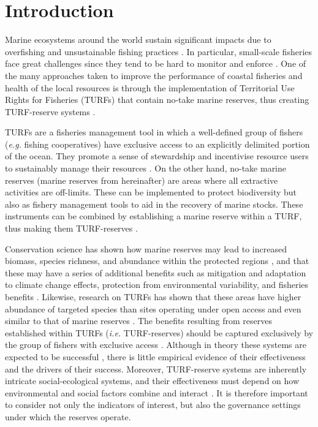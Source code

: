 \documentclass{frontiersSCNS}
\begin{document}
\hypertarget{introduction}{%
\section{Introduction}\label{introduction}}

Marine ecosystems around the world sustain significant impacts due to overfishing and unsustainable fishing practices \citep{pauly_2005-qV,worm_2006-IB,halpern_2008-dK}. In particular, small-scale fisheries face great challenges since they tend to be hard to monitor and enforce \citep{costello_2012}. One of the many approaches taken to improve the performance of coastal fisheries and health of the local resources is through the implementation of Territorial Use Rights for Fisheries (TURFs) that contain no-take marine reserves, thus creating TURF-reserve systems \citep{afflerbach_2014,gelcich_2015,lester_2017}.

TURFs are a fisheries management tool in which a well-defined group of fishers (\emph{e.g.} fishing cooperatives) have exclusive access to an explicitly delimited portion of the ocean. They promote a sense of stewardship and incentivise resource users to sustainably manage their resources \citep{gelcich_2008,costello_2010,mccay_2014}. On the other hand, no-take marine reserves (marine reserves from hereinafter) are areas where all extractive activities are off-limits. These can be implemented to protect biodiversity but also as fishery management tools to aid in the recovery of marine stocks. These instruments can be combined by establishing a marine reserve within a TURF, thus making them TURF-reserves \citep{afflerbach_2014,gelcich_2015,lester_2017}.

Conservation science has shown how marine reserves may lead to increased biomass, species richness, and abundance within the protected regions \citep{lester_2009}, and that these may have a series of additional benefits such as mitigation and adaptation to climate change effects, protection from environmental variability, and fisheries benefits \citep{roberts_2017-J9,micheli_2012-EU,krueck_2017-J1}. Likewise, research on TURFs has shown that these areas have higher abundance of targeted species than sites operating under open access and even similar to that of marine reserves \citep{gelcich_2008,gelcich_2012}. The benefits resulting from reserves established within TURFs (\emph{i.e.} TURF-reserves) should be captured exclusively by the group of fishers with exclusive access \citep{gelcich_2015}. Although in theory these systems are expected to be successful \citep{smallhornwest_2018}, there is little empirical evidence of their effectiveness and the drivers of their success. Moreover, TURF-reserve systems are inherently intricate social-ecological systems, and their effectiveness must depend on how environmental and social factors combine and interact \citep{ostrom_2009,gelcich_2015}. It is therefore important to consider not only the indicators of interest, but also the governance settings under which the reserves operate.
\end{document}
